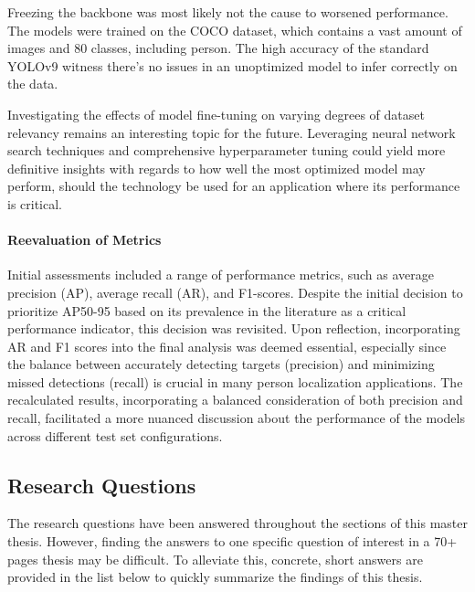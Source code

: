Freezing the backbone was most likely not the cause to worsened performance. The models were trained on the COCO dataset, which contains a vast amount of images and 80 classes, including person. The high accuracy of the standard YOLOv9 witness there's no issues in an unoptimized model to infer correctly on the data.  

Investigating the effects of model fine-tuning on varying degrees of dataset relevancy remains an interesting topic for the future. Leveraging neural network search techniques and comprehensive hyperparameter tuning could yield more definitive insights with regards to how well the most optimized model may perform, should the technology be used for an application where its performance is critical.

\paragraph{Reevaluation of Metrics}
Initial assessments included a range of performance metrics, such as average precision (AP), average recall (AR), and F1-scores. Despite the initial decision to prioritize AP50-95 based on its prevalence in the literature as a critical performance indicator, this decision was revisited. Upon reflection, incorporating AR and F1 scores into the final analysis was deemed essential, especially since the balance between accurately detecting targets (precision) and minimizing missed detections (recall) is crucial in many person localization applications. The recalculated results, incorporating a balanced consideration of both precision and recall, facilitated a more nuanced discussion about the performance of the models across different test set configurations.

\subsection{Research Questions}
\label{sec:discussion_research_q}
The research questions have been answered throughout the sections of this master thesis. However, finding the answers to one specific question of interest in a 70+ pages thesis may be difficult. To alleviate this, concrete, short answers are provided in the list below to quickly summarize the findings of this thesis. 

